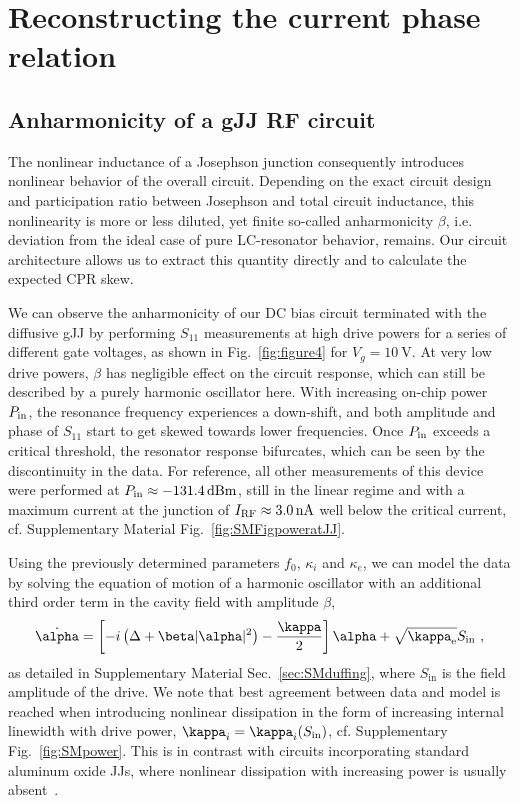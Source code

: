 \section{Reconstructing the current phase relation}

\subsection{Anharmonicity of a gJJ RF circuit}

The nonlinear inductance of a Josephson junction consequently introduces nonlinear behavior of the overall circuit.
%
Depending on the exact circuit design and participation ratio between Josephson and total circuit inductance, this nonlinearity is more or less diluted, yet finite so-called anharmonicity $\beta$, i.e. deviation from the ideal case of pure LC-resonator behavior, remains.
%
Our circuit architecture allows us to extract this quantity directly and to calculate the expected CPR skew.

We can observe the anharmonicity of our DC bias circuit terminated with the diffusive gJJ by performing $S_{11}$ measurements at high drive powers for a series of different gate voltages, as shown in Fig.~\ref{fig:figure4} for $V_g=\SI{+10}{\volt}$.
%
At very low drive powers, $\beta$ has negligible effect on the circuit response, which can still be described by a purely harmonic oscillator here.
%
With increasing on-chip power $P_{\rm in}$, the resonance frequency experiences a down-shift, and both amplitude and phase of $S_{11}$ start to get skewed towards lower frequencies.
%
Once $P_{\rm in}$ exceeds a critical threshold, the resonator response bifurcates, which can be seen by the discontinuity in the data.
%
For reference, all other measurements of this device were performed at $P_{\rm in}\approx\SI{-131.4}{dBm}$, still in the linear regime and with a maximum current at the junction of $I_{\rm RF}\approx\SI{3.0}{\nano\ampere}$ well below the critical current, cf. Supplementary Material Fig.~\ref{fig:SMFigpoweratJJ}.

Using the previously determined parameters $f_0$, $\kappa_i$ and $\kappa_e$, we can model the data by solving the equation of motion of a harmonic oscillator with an additional third order term in the cavity field with amplitude $\beta$, 
%
\begin{align}
\dot{\alpha} = \left[ -i \left( \Delta+\beta\abs{\alpha}^2 \right)-\frac{\kappa}{2} \right]\alpha + \sqrt{\kappa_\text{e}} S_\text{in}\ ,
\label{eq:Duffing-EOM}
\end{align}
%
as detailed in Supplementary Material Sec.~\ref{sec:SMduffing}, where $S_\text{in}$ is the field amplitude of the drive.
%
We note that best agreement between data and model is reached when introducing nonlinear dissipation in the form of increasing internal linewidth with drive power, $\kappa_i=\kappa_i(S_{\rm in})$, cf. Supplementary Fig.~\ref{fig:SMpower}.
%
This is in contrast with circuits incorporating standard aluminum oxide JJs, where nonlinear dissipation with increasing power is usually absent~\cite{boakninDispersiveMicrowaveBifurcation2007b}.

